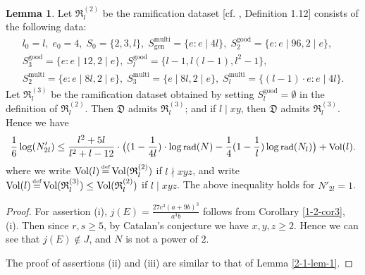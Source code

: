 \documentclass[a4paper, 12pt]{article}
\DeclareMathOperator{\defeq}{\overset{\text{\tiny{def}}}{=}}
\DeclareMathOperator{\rad}{\text{rad}}
\DeclareMathOperator{\good}{\text{good}}
\DeclareMathOperator{\multi}{\text{multi}}
\DeclareMathOperator{\gen}{\text{gen}}
\DeclareMathOperator{\Vol}{\text{Vol}}
\numberwithin{equation}{section}
\theoremstyle{definition}
\newtheorem{lem}[thm]{Lemma}
\begin{document}
\begin{lem}
Let $\mathfrak{R}_l^{(2)}$ be the ramification dataset [cf. \cite{Diophantine_after_IUT_I}, Definition 1.12] consists of the following data:
\begin{gather*}
l_0 = l, \;  e_0 = 4, \; S_0=\{2,3,l\}, \; S_{\gen}^{\multi} = \{e: e\mid 4 l \},  \;
S_2^{\good} = \{e: e\mid 96, 2\mid e\}, \\ 
S_3^{\good} = \{e: e\mid 12, 2\mid e\}, \;
S_l^{\good} = \{l-1, l(l-1), l^2-1\}, \\
S_2^{\multi} = \{e: e\mid 8 l, 2\mid e\}, \; S_3^{\multi} = \{e\mid 8 l, 2\mid e\}, \;
S_l^{\multi} = \{(l-1)\cdot e: e\mid 4 l\} .
\end{gather*}
Let $\mathfrak{R}_l^{(3)}$ be the ramification dataset obtained by setting $S_l^{\good} = \emptyset$ in the definition of $\mathfrak{R}_l^{(2)}$.
Then $\mathfrak D$ admits $\mathfrak R_l^{(3)}$; and if $l\mid xy$, then $\mathfrak D$ admits $\mathfrak R_l^{(3)}$.
Hence we have 
\begin{equation} \small \label{4-1-eq2}
\frac{1}{6}\log(N'_{2l}) \le  \frac{l^2+5l}{l^2+l-12}\cdot \big( (1-\frac{1}{4  l})\cdot \log\rad(N) - \frac{1}{4}(1- \frac{1}{l}) \log\rad(N_l) \big) + \Vol(l).
\end{equation}
where we write $\Vol(l) \defeq \Vol(\mathfrak R_l^{(2)})$ if $l\nmid xyz$, and write $\Vol(l) \defeq \Vol(\mathfrak R_l^{(3)}) \le \Vol(\mathfrak R_l^{(2)})$ if $l\mid xyz$.
The above inequality holds for $N'_{2l} = 1$.

\end{lem}
\begin{proof}
For assertion (i), $ j(E) = \frac{27 c^3 (a+9b)^3}{a^3 b}$ follows from Corollary \ref{1-2-cor3}, (i). Then since $r,s \ge 5$, by Catalan's conjecture we have $x,y,z \ge 2$. Hence we can see that $j(E) \not\in J$, and $N$ is not a power of $2$.

The proof of assertions (ii) and (iii) are similar to that of Lemma \ref{2-1-lem-1}.
\end{proof}
\end{document}
